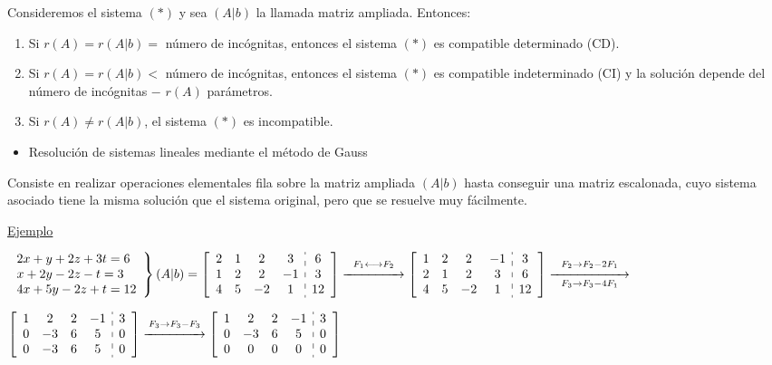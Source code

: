 \documentclass[12pt]{article}
\begin{document}
Consideremos el sistema $(*)$ y sea $(A|b)$ la llamada matriz
ampliada. Entonces:
\begin{enumerate}[label=\arabic*)]
\item Si $r(A)=r(A|b)=$ número de incógnitas, entonces el
sistema $(*)$ es compatible determinado (CD).
\item Si $r(A)=r(A|b)<$ número de incógnitas, entonces el
sistema $(*)$ es compatible indeterminado (CI) y la solución
depende del número de incógnitas $-$ $r(A)$ parámetros.
\item Si $r(A)\neq r(A|b)$, el sistema $(*)$ es incompatible.\end{enumerate}
\begin{itemize}[label=\color{red}\textbullet, leftmargin=*]
\item \color{lightblue} Resolución de sistemas lineales mediante
el método de Gauss
\end{itemize}
Consiste en realizar operaciones elementales fila sobre la
matriz ampliada $(A|b)$ hasta conseguir una matriz escalonada,
cuyo sistema asociado tiene la misma solución que el sistema
original, pero que se resuelve muy fácilmente.

\underline{Ejemplo}

$\left.\begin{array}{l}
2x+y+2z+3t=6\\
x+2y-2z-t=3\\
4x+5y-2z+t=12
\end{array}\right\rbrace(A|b)=\left[\begin{array}{cccc:c}
2 & 1 & 2 & 3 & 6 \\ 
1 & 2 & 2 & -1 & 3 \\ 
4 & 5 & -2 & 1 & 12
\end{array} \right]\overset{F_1\longleftrightarrow
F_2}{\xrightarrow{\hspace{1.5cm}}}\left[\begin{array}{cccc:c}
1 & 2 & 2 & -1 & 3 \\ 
2 & 1 & 2 & 3 & 6 \\ 
4 & 5 & -2 & 1 & 12
\end{array} \right]\overset{F_2\rightarrow
F_2-2F_1}{\underset{F_3\rightarrow
F_3-4F_1}{\xrightarrow{\hspace{2cm}}}}$

$\left[\begin{array}{cccc:c}
1 & 2 & 2 & -1 & 3 \\ 
0 & -3 & 6 & 5 & 0 \\ 
0 & -3 & 6 & 5 & 0
\end{array} \right]\overset{F_3\rightarrow
F_3-F_3}{\xrightarrow{\hspace{1.5cm}}}\left[\begin{array}{cccc:c}
1 & 2 & 2 & -1 & 3 \\ 
0 & -3 & 6 & 5 & 0 \\ 
0 & 0 & 0 & 0 & 0
\end{array} \right]$
\end{document}
